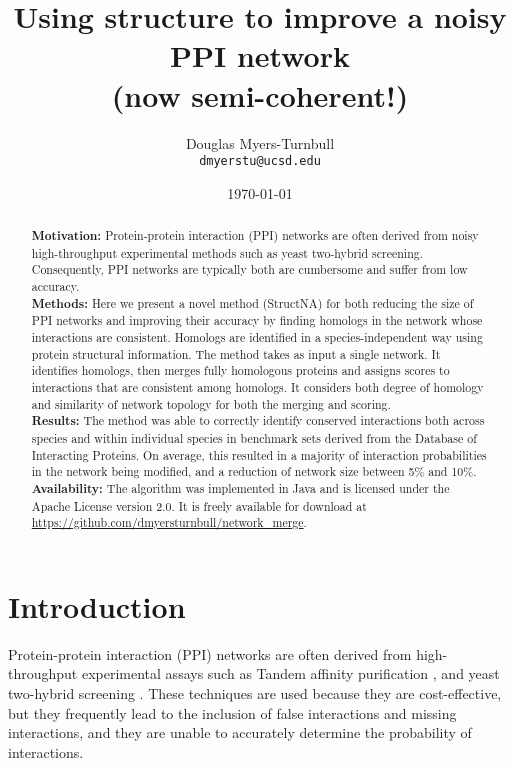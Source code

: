 \documentclass[12pt,twoside]{article}
\def\NI{\noindent}
\begin{document}
\title{\textbf{Using structure to improve a noisy PPI network} \\ \Large{(now semi-coherent!)}}
\author{Douglas Myers-Turnbull\\ \texttt{dmyerstu@ucsd.edu}}
\date{\small{\today}}
\maketitle

\begin{abstract}
\NI \textbf{Motivation: } Protein-protein interaction (PPI) networks are often derived from noisy high-throughput experimental methods such as yeast two-hybrid screening. Consequently, PPI networks are typically both are cumbersome and suffer from low accuracy.\\
\NI \textbf{Methods: } Here we present a novel method (StructNA) for both reducing the size of PPI networks and improving their accuracy by finding homologs in the network whose interactions are consistent. Homologs are identified in a species-independent way using protein structural information. The method takes as input a single network. It identifies homologs, then merges fully homologous proteins and assigns scores to  interactions that are consistent among homologs. It considers both degree of homology and similarity of network topology for both the merging and scoring.\\
\NI \textbf{Results: } The method was able to correctly identify conserved interactions both across species and within individual species in benchmark sets derived from the Database of Interacting Proteins. On average, this resulted in a majority of interaction probabilities in the network being modified, and a reduction of network size between 5\% and 10\%. \\
\NI \textbf{Availability: } The algorithm was implemented in Java and is licensed under the Apache License version 2.0. It is freely available for download at \url{https://github.com/dmyersturnbull/network_merge}.
\end{abstract}

\section{Introduction}
\NI Protein-protein interaction (PPI) networks are often derived from high-throughput experimental assays such as Tandem affinity purification \cite{rigaut}, and yeast two-hybrid screening \cite{fields}. These techniques are used because they are cost-effective, but they frequently lead to the inclusion of false interactions and missing interactions, and they are unable to accurately determine the probability of interactions.
\end{document}
